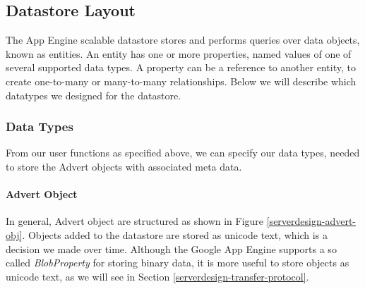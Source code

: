 %

\subsection{Datastore Layout}
\label{serverdesign-datastore}
The App Engine scalable datastore stores and performs queries over data objects,
known as entities. An entity has one or more properties, named values of one of
several supported data types. A property can be a reference to another entity, to
create one-to-many or many-to-many relationships. Below we will describe which
datatypes we designed for the datastore.

\subsubsection{Data Types}
From our user functions as specified above, we can specify our data types,
needed to store the Advert objects with associated meta data.

\paragraph{Advert Object}
In general, Advert object are structured as shown in Figure
\ref{serverdesign-advert-obj}. Objects added to the datastore are stored as
unicode text, which is a decision we made over time. Although the Google App
Engine supports a so called \emph{BlobProperty} for storing binary data, it is
more useful to store objects as unicode text, as we will see in Section
\ref{serverdesign-transfer-protocol}.

